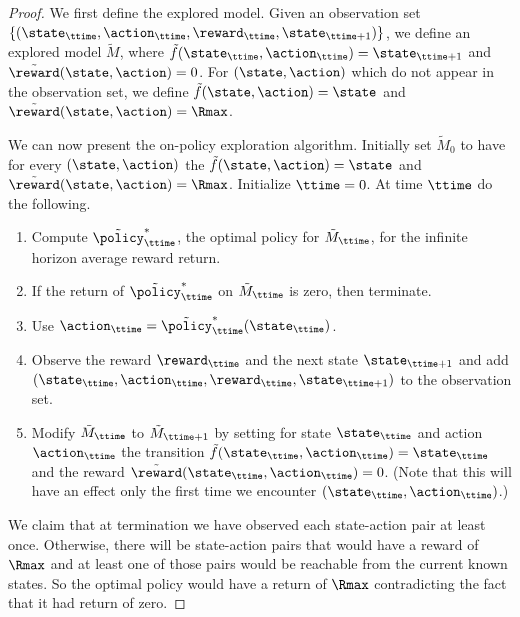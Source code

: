 \begin{proof}
We first define the explored model. Given an observation set
$\{(\state_\ttime,\action_\ttime ,\reward_\ttime,
\state_{\ttime+1})\}$, we define an explored model $\tilde{M}$,
where $\tilde{f}(\state_\ttime,\action_\ttime)=\state_{\ttime+1}$
and $\tilde{\reward}(\state,\action)=0$.
%
For $(\state,\action)$ which do not appear in the observation set,
we define $\tilde{f}(\state,\action)=\state$ and
$\tilde{\reward}(\state,\action)=\Rmax$.


We can now present the on-policy exploration algorithm. Initially
set $\tilde{M}_0$ to have for every $(\state,\action)$ the
$\tilde{f}(\state,\action)=\state$ and
$\tilde{\reward}(\state,\action)=\Rmax$. Initialize $\ttime=0$. At
time $\ttime$ do the following.
\begin{enumerate}
\item
Compute $\tilde{\policy}^*_\ttime$, the optimal policy for
$\tilde{M}_\ttime$, for the infinite horizon average reward return.
\item
If the return of $\tilde{\policy}^*_\ttime$ on $\tilde{M}_\ttime$ is
zero, then terminate.
\item
Use $\action_\ttime=\tilde{\policy}^*_\ttime(\state_{\ttime})$.
\item
Observe the reward $\reward_\ttime$ and the next state
$\state_{\ttime+1}$ and add
$(\state_\ttime,\action_\ttime,\reward_\ttime,\state_{\ttime+1})$ to
the observation set.
\item
Modify $\tilde{M}_\ttime$ to  $\tilde{M}_{\ttime+1}$
by setting for state $\state_\ttime$ and action $\action_\ttime$ the
transition $\tilde{f}(\state_\ttime,\action_\ttime)=\state_\ttime$
and the reward $\tilde{\reward}(\state_\ttime,\action_\ttime)=0$.
(Note that this will have an effect only the first time we encounter
$(\state_\ttime,\action_\ttime)$.)
\end{enumerate}

We claim that at termination we have observed each state-action pair
at least once. Otherwise, there will be state-action pairs that
would have a reward of $\Rmax$ and at least one of those pairs would
be reachable from the current known states. So the optimal policy
would have a return of $\Rmax$ contradicting the fact that it had
return of zero.


\end{proof}
